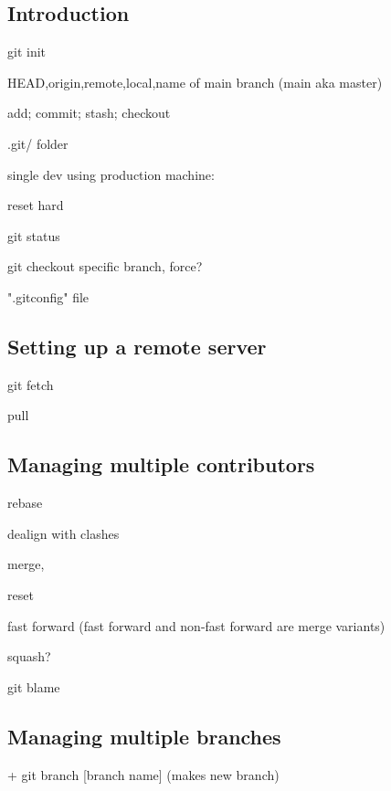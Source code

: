 
\subsection{Introduction}

git init

HEAD,origin,remote,local,name of main branch (main aka master)

add; commit; stash; checkout

.git/ folder

single dev using production machine:


reset hard

git status

git checkout specific branch, force?

".gitconfig" file

\subsection{Setting up a remote server}

git fetch

pull

\subsection{Managing multiple contributors}

rebase

dealign with clashes

merge, 

reset

fast forward (fast forward and non-fast forward are merge variants)

squash?

git blame

\subsection{Managing multiple branches}



+ git branch [branch name] (makes new branch)





